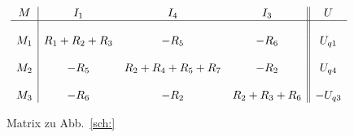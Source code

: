 \newpage

\begin{figure}[h!]
\footnotesize
\[ \begin{array}{c|ccc||c}

M	& I_1 & I_4 & I_3 & U \\
\hline &&&& \\
M_1 	& R_1 + R_2 + R_3 	& -R_5 				& -R_6 			& U_{q1} \\
&&&& \\
M_2 	& -R_5 			& R_2 + R_4 + R_5 + R_7 	& -R_2 			& U_{q4} \\
&&&& \\
M_3 	& -R_6 			& -R_2 				& R_2 + R_3 + R_6 	& -U_{q3} \\
\end{array}
\]
\normalsize
\caption{Matrix zu Abb.~\ref{sch:}}
\end{figure}

